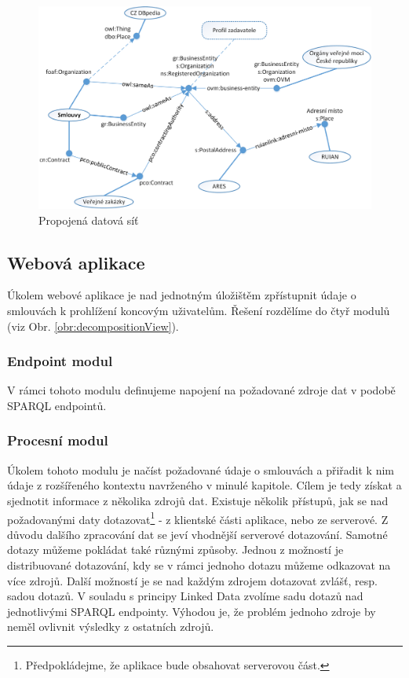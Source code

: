 \begin{figure}[H]
\centerline{\includegraphics[width=\textwidth]{img/architectureLinks.eps}}
\caption{Propojená datová síť}
\label{obr:architectureLinks}
\end{figure}

\subsection{Webová aplikace}

Úkolem webové aplikace je nad jednotným úložištěm zpřístupnit údaje o smlouvách k prohlížení koncovým uživatelům. Řešení rozdělíme do čtyř modulů (viz Obr. \ref{obr:decompositionView}).

\subsubsection*{Endpoint modul}

V rámci tohoto modulu definujeme napojení na požadované zdroje dat v podobě SPARQL endpointů.

\subsubsection*{Procesní modul}

Úkolem tohoto modulu je načíst požadované údaje o smlouvách a přiřadit k nim údaje z rozšířeného kontextu navrženého v minulé kapitole. Cílem je tedy získat a sjednotit informace z několika zdrojů dat. Existuje několik přístupů, jak se nad požadovanými daty dotazovat\footnote{Předpokládejme, že aplikace bude obsahovat serverovou část.} - z klientské části aplikace, nebo ze serverové. Z důvodu dalšího zpracování dat se jeví vhodnější serverové dotazování. Samotné dotazy můžeme pokládat také různými způsoby. Jednou z možností je distribuované dotazování, kdy se v rámci jednoho dotazu můžeme odkazovat na více zdrojů. Další možností je se nad každým zdrojem dotazovat zvlášť, resp. sadou dotazů. V souladu s principy Linked Data zvolíme sadu dotazů nad jednotlivými SPARQL endpointy. Výhodou je, že problém jednoho zdroje by neměl ovlivnit výsledky z ostatních zdrojů. 


